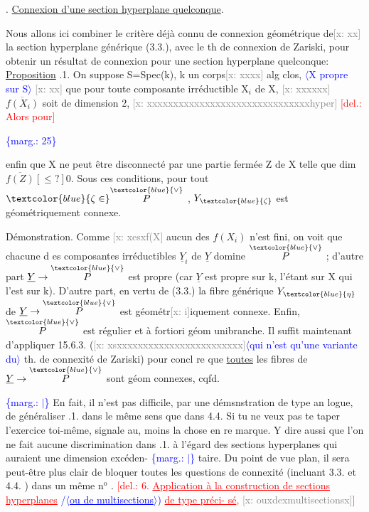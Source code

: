 \documentclass[11pt]{article}
\newcommand{\scanpage}[1]{\par\bigskip\noindent{\small\sffamily[scan #1]}\par}
\newcommand{\mspage}[1]{{\small\sffamily[p.\,#1]}}
\newcommand{\hand}[1]{\textcolor{blue}{#1}}
\let\over\relax
\newcommand{\over}[2]{\textcolor{gray}{#1}\textcolor{blue}{\ensuremath{^{\!\nearrow}}#2}}
\newcommand{\inserted}[2][]{\textcolor{blue}{$\langle$#2$\rangle$}}
\newcommand{\margin}[1]{\textcolor{blue}{\{\textsf{marg.:} #1\}}}
\newcommand{\deleted}[1]{\textcolor{red}{[\textsf{del.:} #1]}}
\newcommand{\xout}[1]{\textcolor{gray}{[\textsf{x:} #1]}}
\newcommand{\uline}[1]{\underline{#1}}
\newcommand{\unsure}[1]{[#1?]}
\newcommand{\illegible}[1]{[\textsf{illeg.\ #1}]}
\begin{document}
\over{\unsure{6}}{5}. \uline{Connexion d'une section hyperplane quelconque}.

Nous allons ici combiner le critère déjà connu de connexion
géométrique de\xout{xx} la section hyperplane générique  (3.3.), avec le
th de connexion de Zariski, pour obtenir un résultat de connexion pour
une section hyperplane quelconque:
\uline{Proposition} \over{\unsure{5}}{6}.1.  On suppose S=Spec(k), k un corps\xout{xxxx} alg clos, \inserted{X propre sur S} \xout{xx}
que pour toute composante irréductible X$_{i}$ de X, \xout{xxxxxx} $\overline{f(X_{i})}$ soit de
dimension \over{$>$}{$\geqslant$} 2, \xout{xxxxxxxxxxxxxxxxxxxxxxxxxxxxxxxhyper} \deleted{Alors pour}

\margin{25}

\clearpage
\scanpage{25/26}
\mspage{22}
enfin que X ne peut être disconnecté par une partie fermée Z de X telle
que dim $\overline{f(Z)} \unsure{\leq} 0$.    Sous ces conditions, pour tout $\hand{\zeta \in} \overset{\hand{\vee}}{P}$ , $Y_{\hand{\zeta}}$ est
géométriquement connexe.

Démonstration.  Comme \xout{xesxf(X} aucun des $f(X_i)$ n'est fini, on voit
que chacune d es composantes irréductibles $\underline{Y}_i$ de $\underline{Y}$ domine $\overset{\hand{\vee}}{P}$ ;
d'autre part $\underline{Y} \to \overset{\hand{\vee}}{P}$ est propre (car $\underline{Y}$ est propre sur k, l'étant sur X
qui l'est sur k).  D'autre part, en vertu de (3.3.) la fibre générique
$Y_{\hand{\eta}}$ de $\underline{Y} \to \overset{\hand{\vee}}{P}$ est géométr\xout{i}iquement connexe. Enfin, $\overset{\hand{\vee}}{P}$ est régulier et
à fortiori géom unibranche. Il suffit maintenant d'appliquer 15.6.3.
(\xout{xsxxxxxxxxxxxxxxxxxxxxxxxx}\inserted[typed]{qui n'est qu'une variante du} th. de connexité  de Zariski) pour concl
re que \uline{toutes} les fibres  de $\underline{Y} \to \overset{\hand{\vee}}{P}$ sont géom connexes, cqfd.

\margin{$|$} En fait,  il n'est pas difficile, par une démsnstration de type an
logue, de généraliser \over{\illegible{1}}{5}.1. dans le même sens que dans 4.4. Si tu ne
veux pas te taper l'exercice toi-même, signale au, moins la chose en re
marque. Y dire aussi que l'on ne fait aucune discrimination dans \over{\illegible{1}}{5}.1.
à l'égard des sections hyperplanes qui auraient une dimension excéden-%
\margin{$|$} taire.  Du point de vue plan, il sera peut-être plus clair de bloquer
toutes les questions de connexité (incluant 3.3. et 4.4. ) dans un
même n$^{\text{o}}$ .
\deleted{6. \uline{Application à la construction de sections hyperplanes} \hand{/}\inserted[typed]{\uline{ou de multisections}}\hand{)} \uline{de type préci-%
sé}, \xout{ouxdexmultisectionsx}}
\mspage{26}
\end{document}
